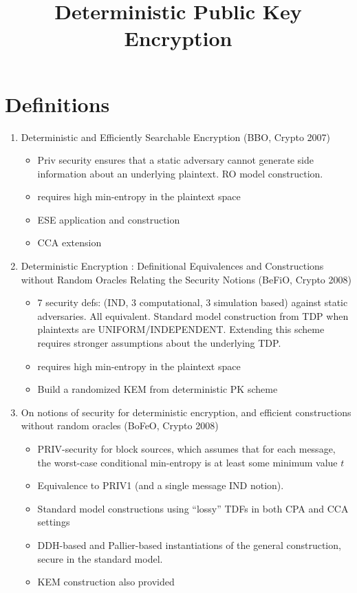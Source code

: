 \documentclass[11pt, pdftex]{article}
\title{Deterministic Public Key Encryption}
\author{}
\date{}
\begin{document}
\maketitle

\section{Definitions}

\begin{enumerate}
\item Deterministic and Efficiently Searchable Encryption (BBO, Crypto 2007)
\begin{itemize}
\item Priv security ensures that a static adversary cannot generate side information about an underlying plaintext.  RO model construction.
\item requires high min-entropy in the plaintext space
\item ESE application and construction
\item CCA extension
\end{itemize}

\item Deterministic Encryption : Definitional Equivalences and Constructions without Random Oracles Relating the Security Notions (BeFiO, Crypto 2008)
\begin{itemize}
\item 7 security defs: (IND, 3 computational, 3 simulation based) against static adversaries.  All equivalent.  Standard model construction from TDP when plaintexts are UNIFORM/INDEPENDENT.  Extending this scheme requires stronger assumptions about the underlying TDP.
\item requires high min-entropy in the plaintext space
\item Build a randomized KEM from deterministic PK scheme
\end{itemize}


\item On notions of security for deterministic encryption, and efficient constructions without random oracles (BoFeO, Crypto 2008)
\begin{itemize}
\item PRIV-security for block sources, which assumes that for each message, the worst-case conditional min-entropy is at least some minimum value $t$
\item Equivalence to PRIV1 (and a single message IND notion).
\item Standard model constructions using ``lossy'' TDFs in both CPA and CCA settings
\item DDH-based and Pallier-based instantiations of the general construction, secure in the standard model.
\item KEM construction also provided
\end{itemize}


\end{enumerate}
\end{document}
